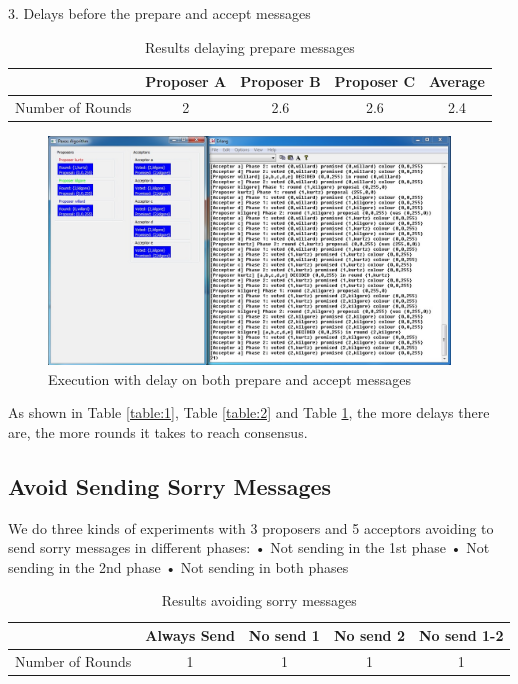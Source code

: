 3. Delays before the prepare and accept messages\newline
\begin{table}[h!]
  \centering
  \begin{tabular}{ |c | c | c | c | c | }
    \hline
                     & Proposer A & Proposer B & Proposer C & Average \\ \hline
    Number of Rounds & 2 & 2.6 & 2.6 & 2.4  \\ \hline
  \end{tabular}
  \caption{Results delaying prepare messages}
  \label{table:3}
\end{table}
\newpage
\begin{figure}[h!]
  \centering
    \includegraphics[width=0.95\textwidth]{./3_Experiments/images/delayAll.jpg}
    \caption{Execution with delay on both prepare and accept messages \label{fig:delay_all}}
\end{figure}
As shown in Table \ref{table:1}, Table \ref{table:2} and Table \ref{table:3}, the more delays there are,
the more rounds it takes to reach consensus.


\subsection{Avoid Sending Sorry Messages}
We do three kinds of experiments with 3 proposers and 5 acceptors avoiding to send
sorry messages in different phases: \newline
• Not sending in the 1st phase \newline
• Not sending in the 2nd phase \newline
• Not sending in both phases \newline

\begin{table}[h!]
  \centering
  \begin{tabular}{ |c | c | c | c | c | }
    \hline
                     & Always Send & No send 1 & No send 2 & No send 1-2 \\ \hline
    Number of Rounds & 1 & 1 & 1 & 1  \\ \hline
  \end{tabular}
  \caption{Results avoiding sorry messages}
  \label{table:4}
\end{table}


